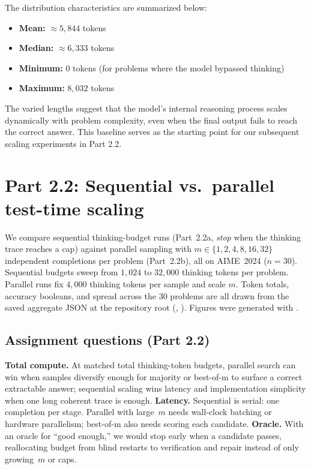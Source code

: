 \documentclass[11pt]{article}
\begin{document}
The distribution characteristics are summarized below:
\begin{itemize}[nosep]
  \item \textbf{Mean:} $\approx 5,844$ tokens
  \item \textbf{Median:} $\approx 6,333$ tokens
  \item \textbf{Minimum:} $0$ tokens (for problems where the model bypassed thinking)
  \item \textbf{Maximum:} $8,032$ tokens
\end{itemize}

The varied lengths suggest that the model's internal reasoning process scales dynamically with problem complexity, even when the final output fails to reach the correct answer. This baseline serves as the starting point for our subsequent scaling experiments in Part 2.2.

\newpage
\section{Part 2.2: Sequential vs.\ parallel test-time scaling}

We compare sequential thinking-budget runs (Part~2.2a, \emph{stop} when the thinking trace reaches a cap) against parallel sampling with $m \in \{1,2,4,8,16,32\}$ independent completions per problem (Part~2.2b), all on AIME~2024 ($n=30$). Sequential budgets sweep from $1{,}024$ to $32{,}000$ thinking tokens per problem. Parallel runs fix $4{,}000$ thinking tokens per sample and scale $m$. Token totals, accuracy booleans, and spread across the $30$ problems are all drawn from the saved aggregate JSON at the repository root (, ). Figures were generated with .

\subsection{Assignment questions (Part 2.2)}

\textbf{Total compute.} At matched total thinking-token budgets, parallel search can win when samples diversify enough for majority or best-of-m to surface a correct extractable answer; sequential scaling wins latency and implementation simplicity when one long coherent trace is enough. \textbf{Latency.} Sequential is serial: one completion per stage. Parallel with large~$m$ needs wall-clock batching or hardware parallelism; best-of-m also needs scoring each candidate. \textbf{Oracle.} With an oracle for ``good enough,'' we would stop early when a candidate passes, reallocating budget from blind restarts to verification and repair instead of only growing~$m$ or caps.
\end{document}

